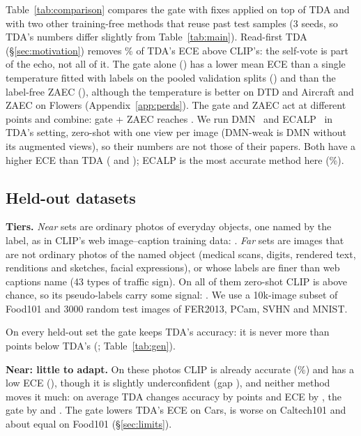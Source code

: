 \documentclass[10pt]{article}
\begin{document}
Table~\ref{tab:comparison} compares the gate with fixes applied on top of TDA and with two other training-free methods
that reuse past test samples (3 seeds, so TDA's numbers differ slightly from Table~\ref{tab:main}). Read-first TDA
(\S\ref{sec:motivation}) removes \readFirstExcessShare\% of TDA's ECE above CLIP's: the self-vote is part of the echo,
not all of it. The gate alone (\cmpGateEce) has a lower mean ECE than a single temperature fitted with labels on the
pooled validation splits (\cmpTdaTEce) and than the label-free ZAEC (\cmpTdaZaecEce), although the temperature is better
on DTD and Aircraft and ZAEC on Flowers (Appendix~\ref{app:perds}). The gate and ZAEC act at different points and
combine: gate + ZAEC reaches \cmpGateZaecEce. We run DMN~\cite{zhang2024dmn} and ECALP~\cite{li2025ecalp} in TDA's
setting, zero-shot with one view per image (DMN-weak is DMN without its augmented views), so their numbers are not those
of their papers. Both have a higher ECE than TDA (\cmpDmnEce{} and \cmpEcalpEce); ECALP is the most accurate method here
(\cmpEcalpAcc\%).

\subsection{Held-out datasets}\label{sec:gen}
\textbf{Tiers.} \emph{Near} sets are ordinary photos of everyday objects, one named by the label, as in CLIP's web
image--caption training data: \nearNames. \emph{Far} sets are images that are not ordinary photos of the named object
(medical scans, digits, rendered text, renditions and sketches, facial expressions), or whose labels are finer than web
captions name (43 types of traffic sign). On all of them zero-shot CLIP is above chance, so its pseudo-labels carry some
signal: \farNames. We use a 10k-image subset of Food101 and 3000 random test images of FER2013, PCam, SVHN and MNIST.

\begin{table}[t]
\centering\small
\caption{Held-out sets, 3 seeds. Bold: best mean accuracy and ECE of each tier. Gap: mean confidence minus accuracy,
positive when overconfident (\S\ref{sec:limits}).}
\label{tab:gen}
\resizebox{\linewidth}{!}{}
\end{table}

On every held-out set the gate keeps TDA's accuracy: it is never more than \genWorstDropAcc{} points below TDA's
(\genWorstDropName; Table~\ref{tab:gen}).

\textbf{Near: little to adapt.} On these photos CLIP is already accurate (\genNearMeanClipAcc\%) and has a low ECE
(\genNearMeanClipEce), though it is slightly underconfident (gap \gapNearClip), and neither method moves it much: on average TDA changes accuracy by
\genNearTdaOverClipAcc{} points and ECE by \genNearTdaOverClipEce, the gate by \genNearGateOverClipAcc{} and
\genNearGateOverClipEce. The gate lowers TDA's ECE on Cars, is worse on Caltech101 and about equal on Food101
(\S\ref{sec:limits}).
\end{document}
